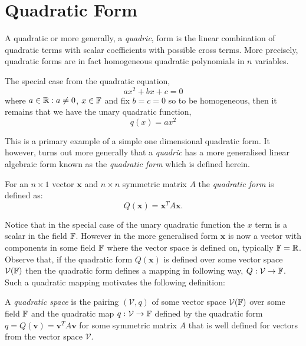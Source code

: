 
\section{Quadratic Form} %
\label{sec:quadraticform}

A quadratic or more generally, a \emph{quadric}, form is the
linear combination of quadratic terms with scalar coefficients
with possible cross terms. More precisely, quadratic forms are
in fact homogeneous quadratic polynomials in $n$ variables.

The special case from the quadratic equation,
\[
 a x^2 + b x + c = 0
\]
where $a \in \mathbb{R} : a \neq 0$, $x \in \mathbb{F}$ and fix $b=c=0$ so
to be homogeneous, then it remains that we have the unary
quadratic function,
\[
 q(x) = a x^2
\]

This is a primary example of a simple one dimensional
quadratic form. It however, turns out more generally that a
\emph{quadric} has a more generalised linear algebraic form
known as the \emph{quadratic form} which is defined herein.

\begin{defn}
For an $n \times 1$ vector $\mathbf{x}$ and $n \times n$
symmetric matrix $A$ the \emph{quadratic form} is defined as:
\[
 Q(\mathbf{x}) = \mathbf{x}^{T} A \mathbf{x}.
\]
\end{defn}

Notice that in the special case of the unary quadratic function
the $x$ term is a scalar in the field $\mathbb{F}$. However in the
more generalised form $\mathbf{x}$ is now a vector with
components in some field $\mathbb{F}$ where the vector space is
defined on, typically $\mathbb{F} = \mathbb{R}$. Observe that, if the
quadratic form $Q(\mathbf{x})$ is defined over some vector space
$\mathcal{V}(\mathbb{F})$ then the quadratic form defines a mapping in
following way, $Q : \mathcal{V} \to \mathbb{F}$.
Such a quadratic mapping motivates the following definition:

\begin{defn}
 A \emph{quadratic space} is the pairing $(\mathcal{V}, q)$
 of some vector space $\mathcal{V}(\mathbb{F})$ over some field $\mathbb{F}$
 and the quadratic map $q : \mathcal{V} \to \mathbb{F}$ defined by
 the quadratic form $q = Q(\mathbf{v}) = \mathbf{v}^{T} A \mathbf{v}$
 for some symmetric matrix $A$ that is well defined for vectors
 from the vector space $\mathcal{V}$.
\end{defn}

